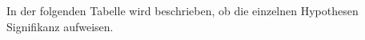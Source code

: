 \documentclass[a4paper,11pt]{article}%
\renewcommand{\\}{\vspace*{0.5\baselineskip} \newline}
\begin{document}
%	
%		
%
%		
%		
%		
%
%		
%		
%			
%		
%		
%			
%		
In der folgenden Tabelle wird beschrieben, ob die einzelnen Hypothesen Signifikanz aufweisen.

%
\end{document}
